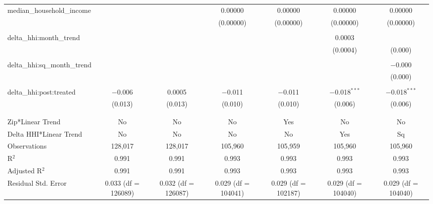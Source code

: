 \begin{table}[H]
{\begin{tabular}{@{\extracolsep{5pt}}lcccccc}
  median\_household\_income &  &  & 0.00000 & 0.00000 & 0.00000 & 0.00000 \\  

   &  &  & (0.00000) & (0.00000) & (0.00000) & (0.00000) \\  

   & & & & & & \\  

  delta\_hhi:month\_trend &  &  &  &  & 0.0003 &  \\  

   &  &  &  &  & (0.0004) & (0.000) \\  

   & & & & & & \\  

  delta\_hhi:sq\_month\_trend &  &  &  &  &  & $-$0.000 \\  

   &  &  &  &  &  & (0.000) \\  

   & & & & & & \\  

  delta\_hhi:post:treated & $-$0.006 & 0.0005 & $-$0.011 & $-$0.011 & $-$0.018$^{***}$ & $-$0.018$^{***}$ \\  

   & (0.013) & (0.013) & (0.010) & (0.010) & (0.006) & (0.006) \\  

   & & & & & & \\  

 \hline \\[-1.8ex]  

 Zip*Linear Trend & No & No & No & Yes & No & No \\  

 Delta HHI*Linear Trend & No & No & No & No & Yes & Sq \\  

 Observations & 128,017 & 128,017 & 105,960 & 105,959 & 105,960 & 105,960 \\  

 R$^{2}$ & 0.991 & 0.991 & 0.993 & 0.993 & 0.993 & 0.993 \\  

 Adjusted R$^{2}$ & 0.991 & 0.991 & 0.993 & 0.993 & 0.993 & 0.993 \\  

 Residual Std. Error & 0.033 (df = 126089) & 0.032 (df = 126087) & 0.029 (df = 104041) & 0.029 (df = 102187) & 0.029 (df = 104040) & 0.029 (df = 104040) \\  


\end{tabular}}
\end{table}
